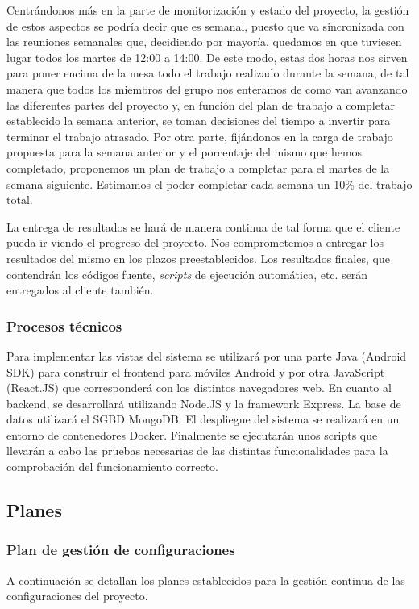 \documentclass{article}
\begin{document}
Centrándonos más en la parte de monitorización y estado del proyecto, la gestión de estos aspectos se podría decir que es semanal, puesto que va sincronizada con las reuniones semanales que, decidiendo por mayoría, quedamos en que tuviesen lugar todos los martes de 12:00 a 14:00. De este modo, estas dos horas nos sirven para poner encima de la mesa todo el trabajo realizado durante la semana, de tal manera que todos los miembros del grupo nos enteramos de como van avanzando las diferentes partes del proyecto y, en función del plan de trabajo a completar establecido la semana anterior, se toman decisiones del tiempo a invertir para terminar el trabajo atrasado. Por otra parte, fijándonos en la carga de trabajo propuesta para la semana anterior y el porcentaje del mismo que hemos completado, proponemos un plan de trabajo a completar para el martes de la semana siguiente. Estimamos el poder completar cada semana un 10\% del trabajo total.

La entrega de resultados se hará de manera continua de tal forma que el cliente pueda ir viendo el progreso del proyecto. Nos comprometemos a entregar los resultados del mismo en los plazos preestablecidos. Los resultados finales, que contendrán los códigos fuente, \textit{scripts} de ejecución automática, etc. serán entregados al cliente también.

\subsubsection{Procesos técnicos}
Para implementar las vistas del sistema se utilizará por una parte Java (Android SDK) para construir el frontend para móviles Android y por otra JavaScript (React.JS) que corresponderá con los distintos navegadores web.
En cuanto al backend, se desarrollará utilizando Node.JS y la framework Express. La base de datos utilizará el SGBD MongoDB.
El despliegue del sistema se realizará en un entorno de contenedores Docker.
Finalmente se ejecutarán unos scripts que llevarán a cabo las pruebas necesarias de las distintas funcionalidades para la comprobación del funcionamiento correcto.
\subsection{Planes}

\subsubsection{Plan de gestión de configuraciones}
A continuación se detallan los planes establecidos para la gestión continua de las configuraciones del proyecto.
\end{document}
